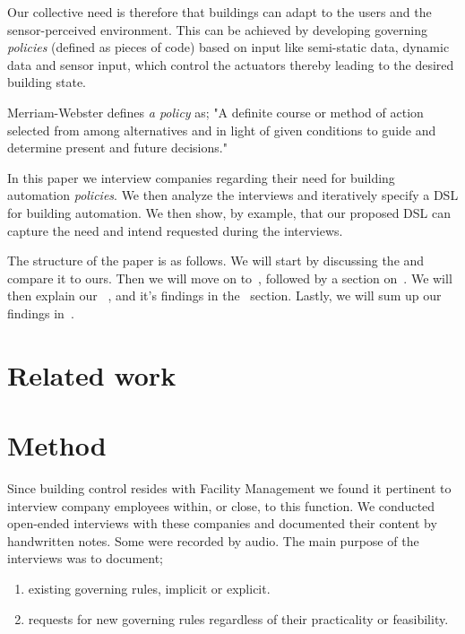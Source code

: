 \documentclass{llncs}
\begin{document}
Our collective need is therefore that buildings can adapt to the users and the sensor-perceived environment. This can be achieved by developing governing \textit{policies} (defined as pieces of code) based on input like semi-static data, dynamic data and sensor input, which control the actuators thereby leading to the desired building state.

Merriam-Webster defines \textit{a policy} as; "A definite course or method of action selected from among alternatives and in light of given conditions to guide and determine present and future decisions."

In this paper we interview companies regarding their need for building automation \textit{policies}. We then analyze the interviews and iteratively specify a DSL for building automation. We then show, by example, that our proposed DSL can capture the need and intend requested during the interviews.

The structure of the paper is as follows. We will start by discussing the and compare it to ours. Then we will move on to~, followed by a section on~. We will then explain our~ , and it's findings in the~ section. Lastly, we will sum up our findings in~.

\section{Related work}\label{sec:relatedwork}

\section{Method}\label{sec:method}
Since building control resides with Facility Management we found it pertinent to interview company employees within, or close, to this function. We conducted open-ended interviews with these companies and documented their content by handwritten notes. Some were recorded by audio. The main purpose of the interviews was to document;

\begin{enumerate}
	\item existing governing rules, implicit or explicit.
	\item requests for new governing rules regardless of their practicality or feasibility.
\end{enumerate}
\end{document}

